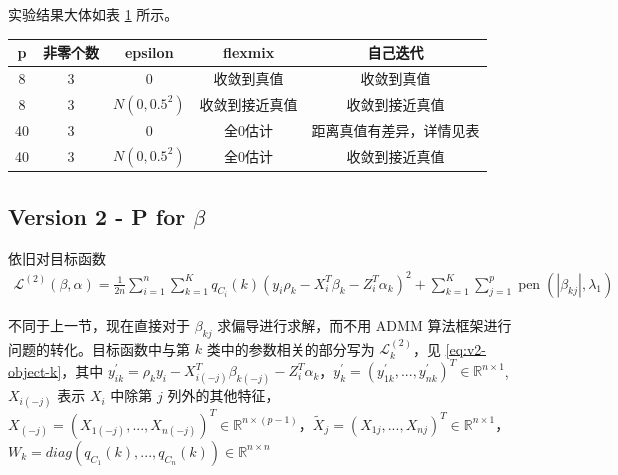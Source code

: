 \documentclass[12pt, a4paper, oneside]{article}
\numberwithin{equation}{section}
\begin{document}
实验结果大体如表 \ref{tb:res-v1} 所示。

\begin{table}[]
	\centering
	\begin{tabular}{ccccc}
		\toprule
		\textbf{p} & \textbf{非零个数} & \textbf{epsilon}            & \textbf{flexmix} & \textbf{自己迭代} \\
		\midrule
		8          & 3             & 0                           & 收敛到真值            & 收敛到真值         \\
		8          & 3             & $N(0,0.5^2)$ & 收敛到接近真值          & 收敛到接近真值       \\
		40         & 3             & 0                           & 全0估计             & 距离真值有差异，详情见表  \\
		40         & 3             & $N(0,0.5^2)$ & 全0估计             & 收敛到接近真值     \\
		\bottomrule 
	\end{tabular}
\label{tb:res-v1}
\end{table}

\subsection{Version 2 - P for $\beta$}

依旧对目标函数 
\begin{equation}
	\begin{aligned}
		\mathcal{L}^{(2)}(\beta,\alpha)=\frac{1}{2n}\sum_{i=1}^{n}\sum_{k=1}^{K} q_{C_i}(k)\left(y_i\rho_k - X_i^T \beta_k - Z_i^T \alpha_k \right)^2 + \sum_{k=1}^{K}\sum_{j=1}^{p} \operatorname{pen}\left(|\beta_{kj}|, \lambda_{1}\right) 
	\end{aligned}
\end{equation}

不同于上一节，现在直接对于 $\beta_{kj}$ 求偏导进行求解，而不用 ADMM 算法框架进行问题的转化。目标函数中与第 $k$ 类中的参数相关的部分写为 $\mathcal{L}^{(2)}_k$，见 \ref{eq:v2-object-k}，其中 $y_{ik}^\prime = \rho_k y_i - X_{i(-j)}^T\beta_{k(-j)} - Z_i^T \alpha_k$，$y_k^\prime = (y_{1k}^\prime, ..., y_{nk}^\prime)^T \in \mathbb{R}^{n\times 1}$, $X_{i(-j)}$ 表示 $X_i$ 中除第 $j$ 列外的其他特征，$X_{(-j)} = (X_{1(-j)},...,X_{n(-j)})^T \in \mathbb{R}^{n\times(p-1)}$，$\tilde{X}_j = (X_{1j}, ..., X_{nj})^T \in \mathbb{R}^{n\times 1}$，$W_k = diag(q_{C_1}(k), ..., q_{C_n}(k)) \in \mathbb{R}^{n\times n}$
\end{document}
